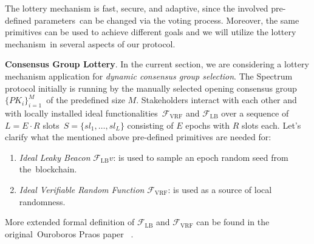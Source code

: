 The lottery mechanism is fast, secure, and adaptive, since the involved pre-defined parameters\
can be changed via the voting process.
Moreover, the same primitives can be used to achieve different goals and we will utilize the lottery mechanism\
in several aspects of our protocol.

\textbf{Consensus Group Lottery}.
In the current section, we are considering a lottery mechanism application for \emph{dynamic consensus group selection}.
The Spectrum protocol initially is running by the manually selected opening consensus group $\{PK_i\}_{i=1}^M$\
of the predefined size $M$.
Stakeholders interact with each other and with locally installed ideal functionalities\
$\mathcal{F}_{\text{VRF}}$ and $\mathcal{F}_{\text{LB}}$ over a sequence of $L = E \cdot R$ slots\
${S=\{sl_1,\dots,sl_L\}}$ consisting of $E$ epochs with $R$ slots each.
Let's clarify what the mentioned above pre-defined primitives are needed for:
\begin{enumerate}
    \item \emph{Ideal Leaky Beacon} $\mathcal{F}_{\text{LB}}v$: is used to sample an epoch random seed from the\
    blockchain.
    \item \emph{Ideal Verifiable Random Function} $\mathcal{F}_{\text{VRF}}$: is used as a source of local randomness.
\end{enumerate}
More extended formal definition of ${\mathcal{F}}_{\text{LB}}$ and ${\mathcal{F}}_{\text{VRF}}$ can be found in the original\
Ouroboros Praos paper ~\cite{cryptoeprint:2017/573}.

